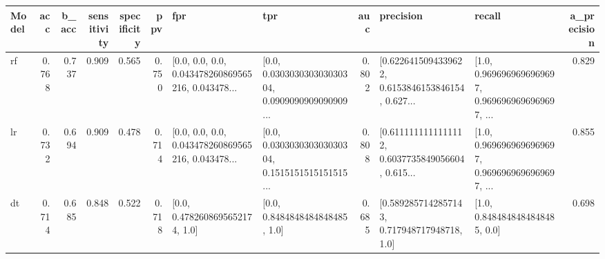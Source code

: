 \begin{tabular}{lrrrrrllrllr}
\toprule
Model &   acc &  b\_acc &  sensitivity &  specificity &   ppv &                                                fpr &                                                tpr &   auc &                                          precision &                                             recall &  a\_precision \\
\midrule
   rf & 0.768 &  0.737 &        0.909 &        0.565 & 0.750 &  [0.0, 0.0, 0.0, 0.043478260869565216, 0.043478... &  [0.0, 0.030303030303030304, 0.0909090909090909... & 0.802 &  [0.6226415094339622, 0.6153846153846154, 0.627... &  [1.0, 0.9696969696969697, 0.9696969696969697, ... &        0.829 \\
   lr & 0.732 &  0.694 &        0.909 &        0.478 & 0.714 &  [0.0, 0.0, 0.0, 0.043478260869565216, 0.043478... &  [0.0, 0.030303030303030304, 0.1515151515151515... & 0.808 &  [0.6111111111111112, 0.6037735849056604, 0.615... &  [1.0, 0.9696969696969697, 0.9696969696969697, ... &        0.855 \\
   dt & 0.714 &  0.685 &        0.848 &        0.522 & 0.718 &                     [0.0, 0.4782608695652174, 1.0] &                     [0.0, 0.8484848484848485, 1.0] & 0.685 &       [0.5892857142857143, 0.717948717948718, 1.0] &                     [1.0, 0.8484848484848485, 0.0] &        0.698 \\
\bottomrule
\end{tabular}
